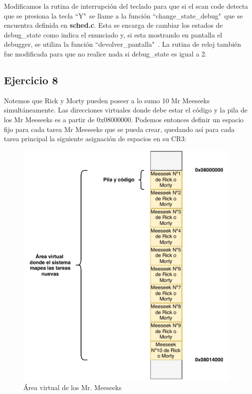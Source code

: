 \documentclass[a4paper]{article}
\begin{document}
\justify
Modificamos la rutina de interrupción del teclado para que si el scan code detecta que se presiona la tecla ``Y"\ se llame a la función ``change_state_debug"\ que se encuentra definida en \textbf{sched.c}. Esta se encarga de cambiar los estados de debug_state como indica el enunciado y, si esta mostrando en pantalla el debugger, se utiliza la función ``devolver_pantalla"\ . La rutina de reloj también fue modificada para que no realice nada si debug_state es igual a $2$.


\subsection{Ejercicio 8}
\justify
Notemos que Rick y Morty pueden poseer a lo sumo 10 Mr Meeseeks simultáneamente. Las direcciones virtuales donde debe estar el código y la pila de los Mr Meeseeks es a partir de 0x08000000. Podemos entonces definir un espacio fijo para cada tarea Mr Meeseeks que se pueda crear, quedando así para cada tarea principal la siguiente asignación de espacios en su CR3:

\begin{figure}[h]
	\centering
	\includegraphics[scale=1.1]{img/AreaVirtualMeeseeks.pdf}
	\caption{Área virtual de los Mr. Meeseeks}
\end{figure}
\end{document}
